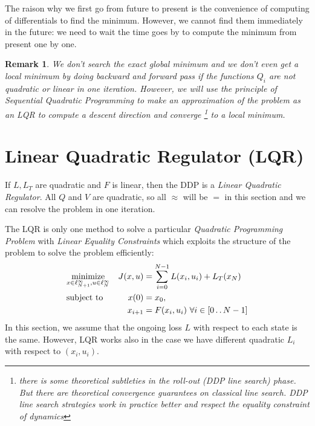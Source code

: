 \documentclass{report}
\newtheorem*{remark}{Remark}
\newcommand{\twodots}{\mathinner {\ldotp \ldotp}}
\begin{document}
The raison why we first go from future to present is the convenience of computing of differentials to find the minimum. However, we cannot find them immediately in the future: we need to wait the time goes by to compute the minimum from present one by one.

\begin{remark}	
	We don't search the exact global minimum and we don't even get a local minimum by doing backward and forward pass if the functions $Q_i$ are not quadratic or linear in one iteration. However, we will use the principle of \emph{Sequential Quadratic Programming} to make an approximation of the problem as an LQR to compute a descent direction and converge \footnote{there is some theoretical subtleties in the roll-out (DDP line search) phase. But there are theoretical convergence guarantees on classical line search. DDP line search strategies work in practice better and respect the equality constraint of dynamics} to a local minimum.
\end{remark}
\section{Linear Quadratic Regulator (LQR)}
If $L, L_T$ are quadratic and $F$ is linear, then the DDP is a \emph{Linear Quadratic Regulator}. All $Q$ and $V$ are quadratic, so all $\approx$ will be $=$ in this section and we can resolve the problem in one iteration.

The LQR is only one method to solve a particular \emph{Quadratic Programming Problem} with \emph{Linear Equality Constraints} which exploits the structure of the problem to solve the problem efficiently:
\begin{equation}
\begin{aligned}
&\underset{x \in \ell_{N+1}^\infty, u \in \ell_{N}^\infty}{\text{minimize}}          &J(x, u) &=\sum_{i = 0}^{N-1} L(x_i, u_i) + L_T(x_N) \\
&\text{subject to}       &x(0)      &= x_0,  \\ %
&							      &x_{i+1}  &= F(x_i, u_i) \ \forall i \in [0 \twodots N-1]
\end{aligned}
\end{equation}
In this section, we assume that the ongoing loss $L$ with respect to each state is the same. However, LQR works also in the case we have different quadratic $L_i$ with respect to $(x_i, u_i)$.
\end{document}
